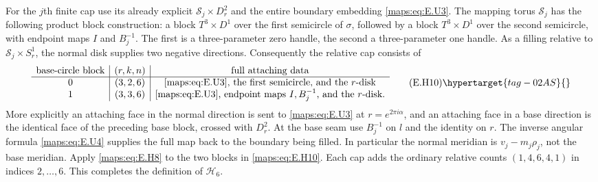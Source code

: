 \begin{theorem}
For the $j$th finite cap use its already explicit
$\mathcal S_j\times D^2_r$ and the entire boundary embedding
\eqref{maps:eq:E.U3}.  The mapping torus $\mathcal S_j$ has the following product
block construction: a block $T^3\times D^1$ over the first
semicircle of $\sigma$, followed by a block $T^3\times D^1$ over
the second semicircle, with endpoint maps $I$ and $B_j^{-1}$.
The first is a three-parameter zero handle, the second a
three-parameter one handle.  As a filling relative to
$\mathcal S_j\times S^1_r$, the normal disk supplies two negative
directions.  Consequently the relative cap consists of
\[
 \begin{array}{c|c|c}
 \hbox{base-circle block}&(r,k,n)&\hbox{full attaching data}\\ \hline
 0&(3,2,6)&\hbox{\eqref{maps:eq:E.U3}, the first semicircle, and the $r$-disk}\\
 1&(3,3,6)&\hbox{\eqref{maps:eq:E.U3}, endpoint maps $I,B_j^{-1}$, and the $r$-disk}.
 \end{array}
 \tag{E.H10}\hypertarget{tag-02AS}{}\label{maps:eq:E.H10}
\]
More explicitly an attaching face in the normal direction is sent
to \eqref{maps:eq:E.U3} at $r=e^{2\pi i\alpha}$, and an attaching face in a
base direction is the identical face of the preceding base block,
crossed with $D^2_r$.  At the base seam use $B_j^{-1}$ on $l$ and
the identity on $r$.  The inverse angular formula \eqref{maps:eq:E.U4} supplies
the full map back to the boundary being filled.  In particular
the normal meridian is $v_j-m_j\rho_j$, not the base meridian.
Apply \eqref{maps:eq:E.H8} to the two blocks in \eqref{maps:eq:E.H10}.  Each cap adds the
ordinary relative counts $(1,4,6,4,1)$ in indices $2,\ldots,6$.
This completes the definition of $\mathcal H_6$.


\end{theorem}
